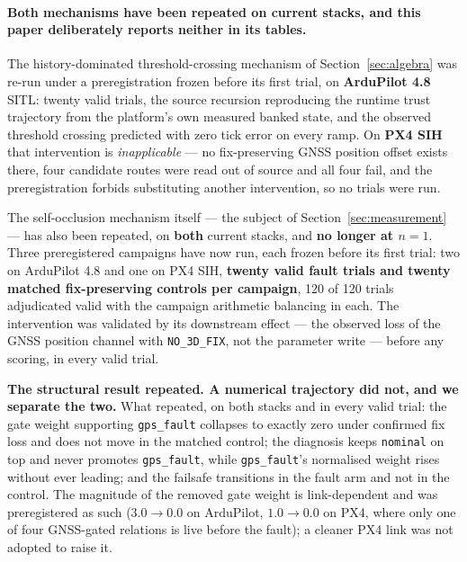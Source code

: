 \documentclass[11pt,a4paper]{article}
\newcommand{\code}[1]{\texttt{\small #1}}
\begin{document}
\paragraph{Both mechanisms have been repeated on current stacks, and this paper
deliberately reports neither in its tables.} The history-dominated
threshold-crossing mechanism of Section~\ref{sec:algebra} was re-run under a
preregistration frozen before its first trial, on \textbf{ArduPilot 4.8} SITL:
twenty valid trials, the source recursion reproducing the runtime trust
trajectory from the platform's own measured banked state, and the observed
threshold crossing predicted with zero tick error on every ramp. On
\textbf{PX4 SIH} that intervention is \emph{inapplicable} --- no fix-preserving
GNSS position offset exists there, four candidate routes were read out of
source and all four fail, and the preregistration forbids substituting another
intervention, so no trials were run.

The self-occlusion mechanism itself --- the subject of
Section~\ref{sec:measurement} --- has also been repeated, on \textbf{both}
current stacks, and \textbf{no longer at $n=1$}. Three preregistered campaigns
have now run, each frozen before its first trial: two on ArduPilot 4.8 and one
on PX4 SIH, \textbf{twenty valid fault trials and twenty matched
fix-preserving controls per campaign}, 120 of 120 trials adjudicated valid
with the campaign arithmetic balancing in each. The intervention was validated
by its downstream effect --- the observed loss of the GNSS position channel
with \code{NO\_3D\_FIX}, not the parameter write --- before any scoring, in
every valid trial.

\textbf{The structural result repeated. A numerical trajectory did not, and we
separate the two.} What repeated, on both stacks and in every valid trial: the
gate weight supporting \code{gps\_fault} collapses to exactly zero under
confirmed fix loss and does not move in the matched control; the diagnosis
keeps \code{nominal} on top and never promotes \code{gps\_fault}, while
\code{gps\_fault}'s normalised weight rises without ever leading; and the
failsafe transitions in the fault arm and not in the control. The magnitude of
the removed gate weight is link-dependent and was preregistered as such
($3.0\to0.0$ on ArduPilot, $1.0\to0.0$ on PX4, where only one of four
GNSS-gated relations is live before the fault); a cleaner PX4 link was not
adopted to raise it.
\end{document}
